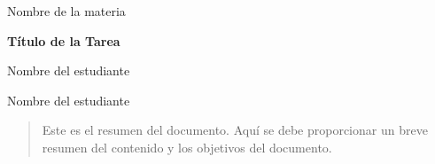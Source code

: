 \vspace*{10pt}
\centering
\huge
Nombre de la materia

\LARGE
\textbf{Título de la Tarea}

\Large
Nombre del estudiante

Nombre del estudiante

\normalsize
\justifying

\begin{abstract}
Este es el resumen del documento. Aquí se debe proporcionar un breve resumen del contenido y los objetivos del documento.
\end{abstract}

\tableofcontents
\newpage

